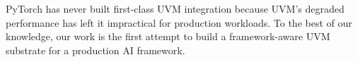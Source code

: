 PyTorch has never built first-class UVM integration
    because UVM's degraded performance has left it impractical for production workloads.
To the best of our knowledge, our work is the first attempt
    to build a framework-aware UVM substrate for a production AI framework.




